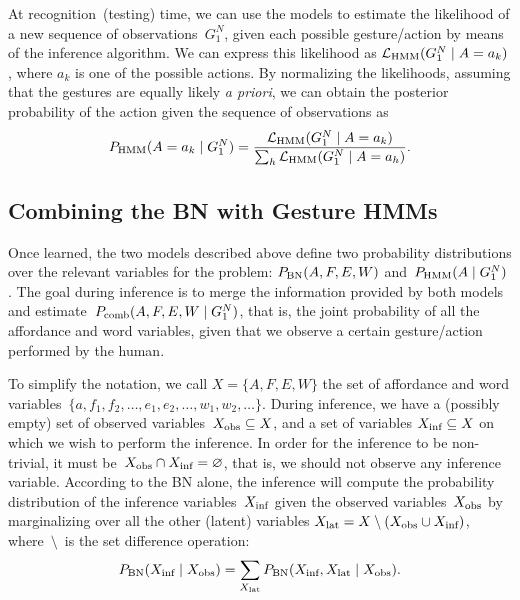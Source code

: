 At recognition~(testing) time, we can use the models to estimate the likelihood of a new sequence of observations~$G_1^N$, given each possible gesture/action by means of the \FB{} inference algorithm.
We can express this likelihood as $\mathcal{L}_\text{HMM}(G_1^N \mid A=a_k)$, where $a_k$ is one of the possible actions.
By normalizing the likelihoods, assuming that the gestures are equally likely \emph{a priori}, we can obtain the posterior probability of the action given the sequence of observations as
\begin{equation} \label{eq:phmm_action}
  \phmm(A=a_k \given G_1^N) = \frac{\mathcal{L}_\text{HMM}(G_1^N \given A=a_k)}{\sum_h \mathcal{L}_\text{HMM}(G_1^N \given A=a_h)}.
\end{equation}

\subsection{Combining the \acs{BN} with Gesture \acsp{HMM}}
\label{sec:combination}
Once learned, the two models described above define two probability distributions over the relevant variables for the problem:
$P_{\text{BN}}(A, F, E, W)$ and~$P_{\text{HMM}}(A \mid G_1^N)$.
The goal during inference is to merge the information provided by both models and estimate~$P_\text{comb}(A, F, E, W \mid G_1^N)$, that is, the joint probability of all the affordance and word variables, given that we observe a certain gesture/action performed by the human.

To simplify the notation, we call $X = \{A, F, E, W\}$ the set of affordance and word variables~$\{a, f_1, f_2, \dots, e_1, e_2, \dots, w_1, w_2, \dots\}$.
During inference, we have a (possibly empty) set of observed variables~$X_\text{obs} \subseteq X$, and a set of variables $X_\text{inf} \subseteq X$ on which we wish to perform the inference.
In order for the inference to be non-trivial, it must be~$X_\text{obs} \cap X_\text{inf} = \varnothing$, that is, we should not observe any inference variable.
According to the \ac{BN} alone, the inference will compute the probability distribution of the inference variables~$X_\text{inf}$ given the observed variables~$X_\text{obs}$ by marginalizing over all the other (latent) variables $X_\text{lat} = X \setminus (X_\text{obs} \cup X_\text{inf})$, where~$\setminus$~is the set difference operation:
\begin{equation*}
 P_{\text{BN}}(X_\text{inf} \mid X_\text{obs}) = \sum_{X_\text{lat}} P_{\text{BN}}(X_\text{inf}, X_\text{lat} \mid X_\text{obs}).
\end{equation*}

